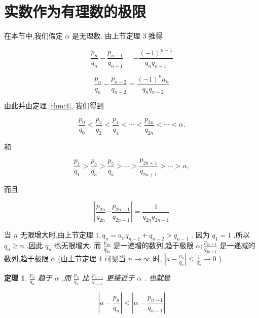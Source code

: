 \documentclass{ctexart}
\newtheorem{theorem}{\indent 定理}[section]
\begin{document}
\section{实数作为有理数的极限}

在本节中,我们假定 \(\alpha\) 是无理数. 由上节定理 3 推得

\[
\frac{{p}_{n}}{{q}_{n}} - \frac{{p}_{n - 1}}{{q}_{n - 1}} = - \frac{{\left( -1\right) }^{n - 1}}{{q}_{n}{q}_{n - 1}}
\]

\[
\frac{{p}_{n}}{{q}_{n}} - \frac{{p}_{n - 2}}{{q}_{n - 2}} = \frac{{\left( -1\right) }^{n}{a}_{n}}{{q}_{n}{q}_{n - 2}}
\]

由此并由定理 \ref{thm:4}, 我们得到

\[
\frac{{p}_{0}}{{q}_{0}} < \frac{{p}_{2}}{{q}_{2}} < \frac{{p}_{4}}{{q}_{4}} < \cdots < \frac{{p}_{2n}}{{q}_{2n}} < \cdots < \alpha.
\]

和

\[
\frac{{p}_{1}}{{q}_{1}} > \frac{{p}_{3}}{{q}_{3}} > \frac{{p}_{5}}{{q}_{5}} > \cdots > \frac{{p}_{{2n} + 1}}{{q}_{{2n} + 1}} > \cdots > \alpha ,
\]

而且

\[
\left| {\frac{{p}_{2n}}{{q}_{2n}}\cdots \frac{{p}_{{2n} - 1}}{{q}_{{2n} - 1}}}\right| = \frac{1}{{q}_{2n}{q}_{{2n} - 1}}
\]

当 \(n\) 无限增大时,由上节定理 \(1,{q}_{n} = {a}_{n}{q}_{n - 1} + {q}_{n - 2} > {q}_{n - 1}\) . 因为 \({q}_{1} = 1\) ,所以 \({q}_{n} \geq n\) ,因此 \({q}_{n}\) 也无限增大. 而 \(\frac{{p}_{2n}}{{\dot{q}}_{2n}}\) 是一递增的数列,趋于极限 \(\alpha ;\frac{{p}_{{2n} + 1}}{{q}_{{2n} + 1}}\) 是一递减的数列,趋于极限 \(\alpha\) (由上节定理 4 可见当 \(n \rightarrow \infty\) 时, \(\left| {a - \frac{{p}_{n}}{{q}_{n}}}\right| \leq \frac{1}{{q}_n^2} \rightarrow 0\) ).

\begin{theorem}
  \label{thm:5}
  \(\frac{{p}_{n}}{{q}_{n}}\) 趋于 \(\alpha\) ,而 \(\frac{{p}_{n}}{{q}_{n}}\) 比 \(\frac{{p}_{n - 1}}{{q}_{n - 1}}\) 更接近于 \(\alpha\) . 也就是

\[
\left| {a - \frac{{p}_{n}}{{q}_{n}}}\right| < \left| {\alpha - \frac{{p}_{n - 1}}{{q}_{n - 1}}}\right|
\]
\end{theorem}
\end{document}
